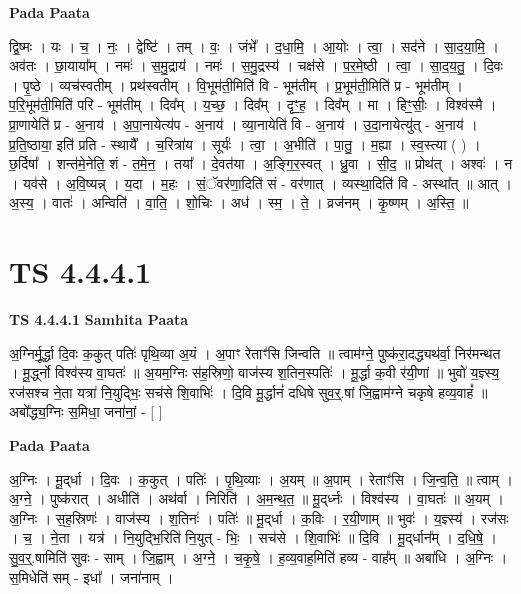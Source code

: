 \documentclass[17pt]{extarticle}
\begin{document}
\textbf{Pada Paata} \newline

द्वि॒ष्मः । यः । च॒ । नः॒ । द्वेष्टि॑ । तम् । वः॒ । जंभे᳚ । द॒धा॒मि॒ । आ॒योः । त्वा॒ । सद॑ने । सा॒द॒या॒मि॒ । अव॑तः । छा॒याया᳚म् । नमः॑ । स॒मु॒द्राय॑ । नमः॑ । स॒मु॒द्रस्य॑ । चक्ष॑से । प॒र॒मे॒ष्ठी । त्वा॒ । सा॒द॒य॒तु॒ । दि॒वः । पृ॒ष्ठे । व्यच॑स्वतीम् । प्रथ॑स्वतीम् । वि॒भूम॑ती॒मिति॑ वि - भूम॑तीम् । प्र॒भूम॑ती॒मिति॑ प्र - भूम॑तीम् । प॒रि॒भूम॑ती॒मिति॑ परि - भूम॑तीम् । दिव᳚म् । य॒च्छ॒ । दिव᳚म् । दृꣳ॒॒ह॒ । दिव᳚म् । मा । हिꣳ॒॒सीः॒ । विश्व॑स्मै । प्रा॒णायेति॑ प्र - अ॒नाय॑ । अ॒पा॒नायेत्य॑प - अ॒नाय॑ । व्या॒नायेति॑ वि - अ॒नाय॑ । उ॒दा॒नायेत्यु॑त् - अ॒नाय॑ । प्र॒ति॒ष्ठाया॒ इति॑ प्रति - स्थायै᳚ । च॒रित्रा॑य । सूर्यः॑ । त्वा॒ । अ॒भीति॑ । पा॒तु॒ । म॒ह्या । स्व॒स्त्या ( ) । छ॒र्दिषा᳚ । शन्त॑मे॒नेति॒ शं - त॒मे॒न॒ । तया᳚ । दे॒वत॑या । अ॒ङ्गि॒र॒स्वत् । ध्रु॒वा । सी॒द॒ ॥ प्रोथ॑त् । अश्वः॑ । न । यव॑से । अ॒वि॒ष्यन्न् । य॒दा । म॒हः । सं॒ॅवर॑णा॒दिति॑ सं - वर॑णात् । व्यस्था॒दिति॑ वि - अस्था᳚त् ॥ आत् । अ॒स्य॒ । वातः॑ । अन्विति॑ । वा॒ति॒ । शो॒चिः । अध॑ । स्म॒ । ते॒ । व्रज॑नम् । कृ॒ष्णम् । अ॒स्ति॒ ॥  \newline




\section*{ TS 4.4.4.1 }

\textbf{TS 4.4.4.1 } \newline
\textbf{Samhita Paata} \newline

अ॒ग्निर्मू॒र्द्धा दि॒वः क॒कुत् पतिः॑ पृथि॒व्या अ॒यं । अ॒पाꣳ रेताꣳ॑सि जिन्वति ॥ त्वाम॑ग्ने॒ पुष्क॑रा॒दद्ध्यथ॑र्वा॒ निर॑मन्थत । मू॒र्द्ध्नो विश्व॑स्य वा॒घतः॑ ॥ अ॒यम॒ग्निः स॑ह॒स्रिणो॒ वाज॑स्य श॒तिन॒स्पतिः॑ । मू॒र्द्धा क॒वी र॑यी॒णां ॥ भुवो॑ य॒ज्ञ्स्य॒ रज॑सश्च ने॒ता यत्रा॑ नि॒युद्भिः॒ सच॑से शि॒वाभिः॑ । दि॒वि मू॒र्द्धानं॑ दधिषे सुव॒र्॒.षां जि॒ह्वाम॑ग्ने चकृषे हव्य॒वाहं᳚ ॥ अबो᳚द्ध्य॒ग्निः स॒मिधा॒ जना॑नां॒ - [  ] \newline

\textbf{Pada Paata} \newline

अ॒ग्निः । मू॒द्‌र्धा । दि॒वः । क॒कुत् । पतिः॑ । पृ॒थि॒व्याः । अ॒यम् ॥ अ॒पाम् । रेताꣳ॑सि । जि॒न्व॒ति॒ ॥ त्वाम् । अ॒ग्ने॒ । पुष्क॑रात् । अधीति॑ । अथ॑र्वा । निरिति॑ । अ॒म॒न्थ॒त॒ ॥ मू॒द्‌र्ध्नः । विश्व॑स्य । वा॒घतः॑ ॥ अ॒यम् । अ॒ग्निः । स॒ह॒स्रिणः॑ । वाज॑स्य । श॒तिनः॑ । पतिः॑ ॥ मू॒द्‌र्धा । क॒विः । र॒यी॒णाम् ॥ भुवः॑ । य॒ज्ञ्स्य॑ । रज॑सः । च॒ । ने॒ता । यत्र॑ । नि॒युद्भि॒रिति॑ नि॒युत् - भिः॒ । सच॑से । शि॒वाभिः॑ ॥ दि॒वि । मू॒द्‌र्धान᳚म् । द॒धि॒षे॒ । सु॒व॒र्॒.षामिति॑ सुवः - साम् । जि॒ह्वाम् । अ॒ग्ने॒ । च॒कृ॒षे॒ । ह॒व्य॒वाह॒मिति॑ हव्य - वाह᳚म् ॥ अबा॑धि । अ॒ग्निः । स॒मिधेति॑ सम् - इधा᳚ । जना॑नाम् ।  \newline
\end{document}
